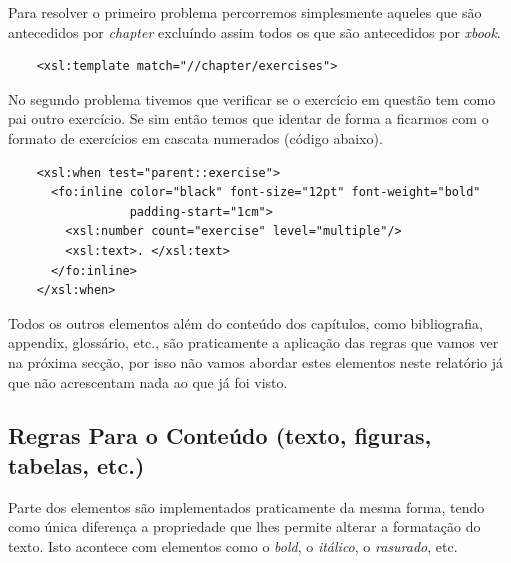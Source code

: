 \documentclass[a4paper]{article}
\begin{document}
\hspace{1cm}Para resolver o primeiro problema percorremos simplesmente aqueles que são antecedidos por {\em chapter} excluíndo assim todos os que são antecedidos por {\em xbook}.\\

\begin{small}
\begin{lstlisting}
    <xsl:template match="//chapter/exercises">
\end{lstlisting}
\end{small}
    
\hspace{1cm}No segundo problema tivemos que verificar se o exercício em questão tem como pai outro exercício. Se sim então temos que identar de forma a ficarmos com o formato de exercícios em cascata numerados (código abaixo).\\

\begin{small}
\begin{lstlisting}
    <xsl:when test="parent::exercise">
      <fo:inline color="black" font-size="12pt" font-weight="bold"
                 padding-start="1cm">
        <xsl:number count="exercise" level="multiple"/>
        <xsl:text>. </xsl:text>
      </fo:inline>
    </xsl:when>
\end{lstlisting}
\end{small}

\vspace{0.3cm}
\hspace{1cm}Todos os outros elementos além do conteúdo dos capítulos, como bibliografia, appendix, glossário, etc., são praticamente a aplicação das regras que vamos ver na próxima secção, por isso não vamos abordar estes elementos neste relatório já que não acrescentam nada ao que já foi visto.\\

\subsection{\large Regras Para o Conteúdo (texto, figuras, tabelas, etc.)}

\hspace{1cm}Parte dos elementos são implementados praticamente da mesma forma, tendo como única diferença a propriedade que lhes permite alterar a formatação do texto. Isto acontece com elementos como o {\em bold}, o {\em itálico}, o {\em rasurado}, etc.\\
\end{document}

